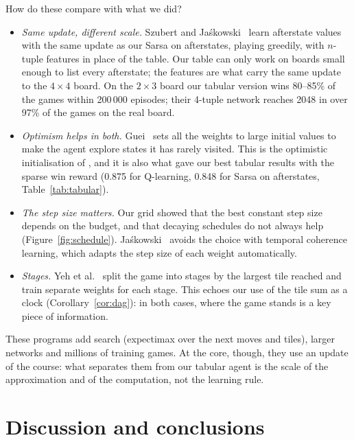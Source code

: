 \documentclass[11pt,a4paper]{article}
\theoremstyle{remark}
\begin{document}
How do these compare with what we did?
\begin{itemize}[leftmargin=*]
\item \emph{Same update, different scale.} Szubert and Ja\'skowski~\cite{szubert2014} learn afterstate values with the same update as our Sarsa on afterstates, playing greedily, with $n$-tuple features in place of the table. Our table can only work on boards small enough to list every afterstate; the features are what carry the same update to the $4\times4$ board. On the $2\times3$ board our tabular version wins 80--85\% of the games within 200\,000 episodes; their 4-tuple network reaches 2048 in over 97\% of the games on the real board.
\item \emph{Optimism helps in both.} Guei~\cite{guei2022} sets all the weights to large initial values to make the agent explore states it has rarely visited. This is the optimistic initialisation of \cite[\S2.6]{sutton2018}, and it is also what gave our best tabular results with the sparse win reward (0.875 for Q-learning, 0.848 for Sarsa on afterstates, Table~\ref{tab:tabular}).
\item \emph{The step size matters.} Our grid showed that the best constant step size depends on the budget, and that decaying schedules do not always help (Figure~\ref{fig:schedule}). Ja\'skowski~\cite{jaskowski2018} avoids the choice with temporal coherence learning, which adapts the step size of each weight automatically.
\item \emph{Stages.} Yeh et al.~\cite{yeh2017} split the game into stages by the largest tile reached and train separate weights for each stage. This echoes our use of the tile sum as a clock (Corollary~\ref{cor:dag}): in both cases, where the game stands is a key piece of information.
\end{itemize}
These programs add search (expectimax over the next moves and tiles), larger networks and millions of training games. At the core, though, they use an update of the course: what separates them from our tabular agent is the scale of the approximation and of the computation, not the learning rule.

\section{Discussion and conclusions}
\end{document}
